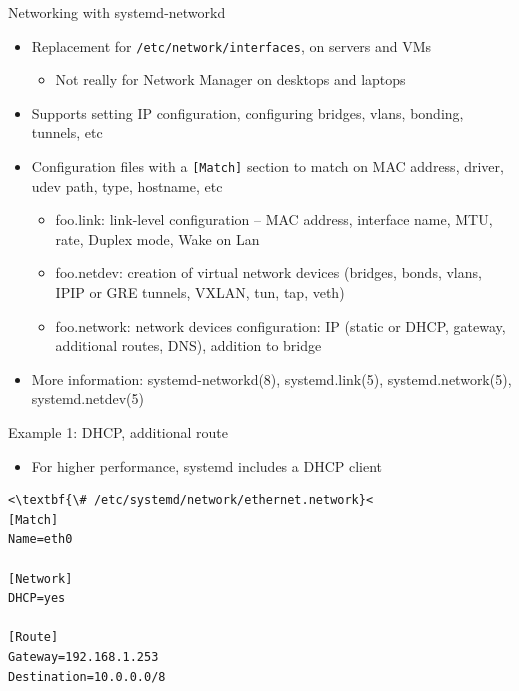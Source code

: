 \documentclass[11pt,final,usepdftitle=false]{beamer}
\begin{document}
\begin{frame}{Networking with systemd-networkd}
	\hbr
\begin{itemize}
\item Replacement for \texttt{/etc/network/interfaces}, on servers and VMs
	\begin{itemize}
		\item Not really for Network Manager on desktops and laptops
	\end{itemize}
\hbr
\item Supports setting IP configuration, configuring bridges, vlans, bonding, tunnels, etc
\hbr
\item Configuration files with a \texttt{[Match]} section to match on MAC address, driver, udev path, type, hostname, etc
	\begin{itemize}
		\item \alert{foo.link:} link-level configuration -- MAC address, interface name, MTU, rate, Duplex mode, Wake on Lan
			\hbr
		\item \alert{foo.netdev:} creation of virtual network devices (bridges, bonds, vlans, IPIP or GRE tunnels, VXLAN, tun, tap, veth)
			\hbr
		\item \alert{foo.network:} network devices configuration: IP (static or DHCP, gateway, additional routes, DNS), addition to bridge
	\end{itemize}
	\hhbr
\item More information: systemd-networkd(8), systemd.link(5), systemd.network(5), systemd.netdev(5)
\end{itemize}
\end{frame}

\begin{frame}[fragile]{Example 1: DHCP, additional route}
\begin{itemize}
\item For higher performance, systemd includes a DHCP client
\end{itemize}

\begin{lstlisting}[basicstyle=\ttfamily\small,escapeinside={<<}]
<\textbf{\# /etc/systemd/network/ethernet.network}<
[Match]
Name=eth0

[Network]
DHCP=yes

[Route]
Gateway=192.168.1.253
Destination=10.0.0.0/8
\end{lstlisting}
\end{frame}
\end{document}
